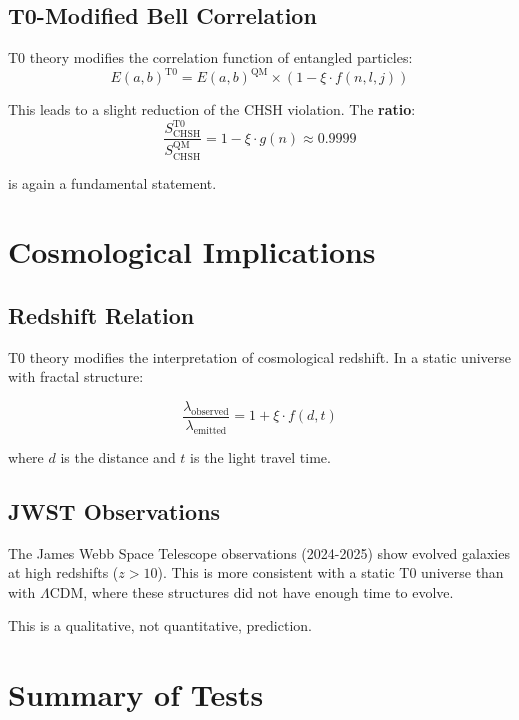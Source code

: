 \subsection{T0-Modified Bell Correlation}

T0 theory modifies the correlation function of entangled particles:
\begin{equation}
	E(a,b)^{\text{T0}} = E(a,b)^{\text{QM}} \times \left(1 - \xi \cdot f(n,l,j)\right)
\end{equation}

This leads to a slight reduction of the CHSH violation. The \textbf{ratio}:
\begin{equation}
	\frac{S_{\text{CHSH}}^{\text{T0}}}{S_{\text{CHSH}}^{\text{QM}}} = 1 - \xi \cdot g(n) 
	\approx 0.9999
\end{equation}

is again a fundamental statement.

\section{Cosmological Implications}

\subsection{Redshift Relation}

T0 theory modifies the interpretation of cosmological redshift. In a static universe with fractal structure:

\begin{equation}
	\frac{\lambda_{\text{observed}}}{\lambda_{\text{emitted}}} = 1 + \xi \cdot f(d,t)
\end{equation}

where $d$ is the distance and $t$ is the light travel time.

\subsection{JWST Observations}

The James Webb Space Telescope observations (2024-2025) show evolved galaxies at high redshifts ($z > 10$). This is more consistent with a static T0 universe than with $\Lambda$CDM, where these structures did not have enough time to evolve.

This is a qualitative, not quantitative, prediction.

\section{Summary of Tests}

